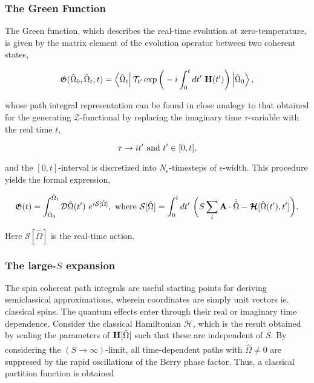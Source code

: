 \subsubsection{The Green Function}

The Green function, which describes the real-time evolution at zero-temperature, is given by the matrix element of the evolution operator between two coherent states, 

\begin{equation}
    \mathfrak{G}(\hat{\Omega}_0, \hat{\Omega}_t; t) = \bra{\hat{\Omega}_t} \mathcal{T}_{t'} \exp \bigg(-i \int_{0}^{t} dt' \textnormal{ } {\bf H}(t')\bigg) \ket{\hat{\Omega}_0},
\end{equation}

whose path integral representation can be found in close analogy to that obtained for the generating $\mathcal{Z}$-functional by replacing the imaginary time $\tau$-variable with the real time $t$,

\begin{equation*}
    \tau \rightarrow it' \textnormal{ and } t' \in [0,t],
\end{equation*}

and the $[0,t]$-interval is discretized into $N_{\epsilon}$-timesteps of $\epsilon$-width. This procedure yields the formal expression, 

\begin{equation}
    \mathfrak{G}(t) = \int_{\hat{\Omega}_0}^{\hat{\Omega}_t} \mathcal{D} \hat{\Omega}(t') \textnormal{ } e^{i \mathcal{S}[\hat{\Omega}]}, \textnormal{ where } \mathcal{S}[\hat{\Omega}] = \int_{0}^{t} dt' \textnormal{ } \bigg(S \sum_{i} {\bf A} \cdot \dot{\hat{\Omega}} - \bm{\mathcal{H}}[\hat{\Omega}(t'), t'] \bigg).
\end{equation}

Here $\mathcal{S}[\hat{\Omega}]$ is the real-time action. \bigbreak

\subsubsection{The large-$S$ expansion}

The spin coherent path integrals are useful starting points for deriving semiclassical approximations, wherein coordinates are simply unit vectors ie. classical spins. The quantum effects enter through their real or imaginary time dependence. Consider the classical Hamiltonian $\bm{\mathcal{H}}$, which is the result obtained by scaling the parameters of ${\bf H}[\hat{\Omega}]$ such that these are independent of $S$. By considering the $(S \rightarrow \infty)$-limit, all time-dependent paths with $\dot{\hat{\Omega}} \neq 0$ are suppresed by the rapid oscillations of the Berry phase factor. Thus, a classical partition function is obtained 


